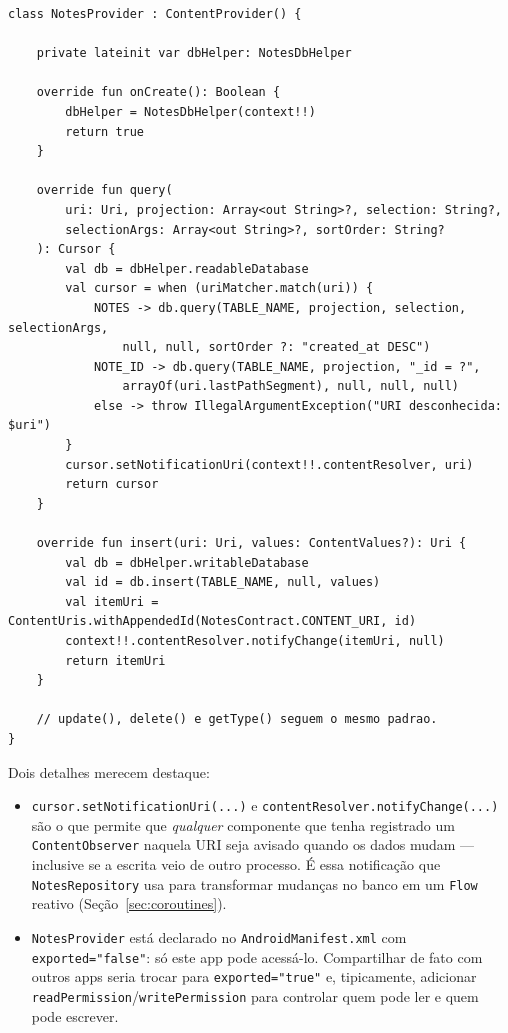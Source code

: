\documentclass[11pt,a4paper]{article}
\begin{document}
\begin{lstlisting}[caption={NotesProvider: query e insert via URI, com notifyChange}, label=lst:contentprovider]
class NotesProvider : ContentProvider() {

    private lateinit var dbHelper: NotesDbHelper

    override fun onCreate(): Boolean {
        dbHelper = NotesDbHelper(context!!)
        return true
    }

    override fun query(
        uri: Uri, projection: Array<out String>?, selection: String?,
        selectionArgs: Array<out String>?, sortOrder: String?
    ): Cursor {
        val db = dbHelper.readableDatabase
        val cursor = when (uriMatcher.match(uri)) {
            NOTES -> db.query(TABLE_NAME, projection, selection, selectionArgs,
                null, null, sortOrder ?: "created_at DESC")
            NOTE_ID -> db.query(TABLE_NAME, projection, "_id = ?",
                arrayOf(uri.lastPathSegment), null, null, null)
            else -> throw IllegalArgumentException("URI desconhecida: $uri")
        }
        cursor.setNotificationUri(context!!.contentResolver, uri)
        return cursor
    }

    override fun insert(uri: Uri, values: ContentValues?): Uri {
        val db = dbHelper.writableDatabase
        val id = db.insert(TABLE_NAME, null, values)
        val itemUri = ContentUris.withAppendedId(NotesContract.CONTENT_URI, id)
        context!!.contentResolver.notifyChange(itemUri, null)
        return itemUri
    }

    // update(), delete() e getType() seguem o mesmo padrao.
}
\end{lstlisting}

Dois detalhes merecem destaque:

\begin{itemize}
    \item \texttt{cursor.setNotificationUri(...)} e
    \texttt{contentResolver.notifyChange(...)} são o que permite que
    \emph{qualquer} componente que tenha registrado um
    \texttt{ContentObserver} naquela URI seja avisado quando os dados
    mudam — inclusive se a escrita veio de outro processo. É essa
    notificação que \texttt{NotesRepository} usa para transformar
    mudanças no banco em um \texttt{Flow} reativo (Seção~\ref{sec:coroutines}).
    \item \texttt{NotesProvider} está declarado no
    \texttt{AndroidManifest.xml} com \texttt{exported="false"}: só este
    app pode acessá-lo. Compartilhar de fato com outros apps seria
    trocar para \texttt{exported="true"} e, tipicamente, adicionar
    \texttt{readPermission}/\texttt{writePermission} para controlar quem
    pode ler e quem pode escrever.
\end{itemize}
\end{document}
